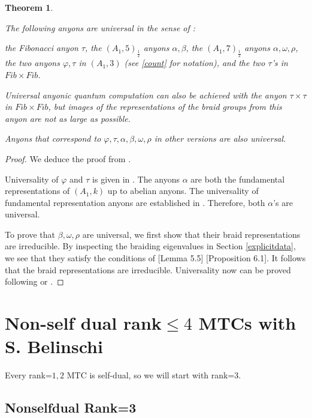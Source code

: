 \documentclass[12pt,psamsfonts]{amsart}
\numberwithin{equation}{section}
\newtheorem{theorem}{Theorem}[section]
\theoremstyle{definition}
\begin{document}
\begin{theorem}\label{universalanyon}

The following anyons are universal in the sense of \cite{FKLW}:

the Fibonacci anyon $\tau$, the $(A_1,5)_{\frac{1}{2}}$ anyons
$\alpha,\beta$, the $(A_1,7)_{\frac{1}{2}}$ anyons
$\alpha,\omega,\rho$, the two anyons $\varphi, \tau$ in $(A_1,3)$
(see \ref{count} for notation), and the two $\tau$'s in $Fib\times
Fib$.

Universal anyonic quantum computation can also be achieved with
the anyon $\tau \times \tau$ in $Fib\times Fib$, but images of the
representations of the braid groups from this anyon are not as
large as possible.

Anyons that correspond to $\varphi, \tau,\alpha,\beta,\omega,\rho$
in other versions are also universal.

\end{theorem}

\begin{proof}

We deduce the proof from \cite{FLW}\cite{LRW}\cite{LWa}.

Universality of $\varphi$ and $\tau$ is given in \cite{FLW}.  The anyons $\alpha$ are both the
fundamental representations of $(A_1,k)$ up to abelian anyons. The
universality of fundamental representation anyons are established in \cite{FLW}.
Therefore, both $\alpha$'s are universal.

To prove that $\beta, \omega,\rho$ are universal, we first show
that their braid representations are irreducible.  By inspecting
the braiding eigenvalues in Section \ref{explicitdata}, we see
that they satisfy the conditions of \cite{TuWe}[Lemma 5.5]
\cite{HRW}[Proposition 6.1].  It follows that the braid
representations are irreducible.  Universality now can be proved
following \cite{FLW} or \cite{LRW}.

\end{proof}

\appendix

\section{Non-self dual rank$\leq 4$ MTCs with S.
Belinschi}\label{nonselfdual}

Every rank=$1,2$ MTC is self-dual, so we will start with rank=$3$.

\subsection{Nonselfdual Rank=3}
\end{document}
